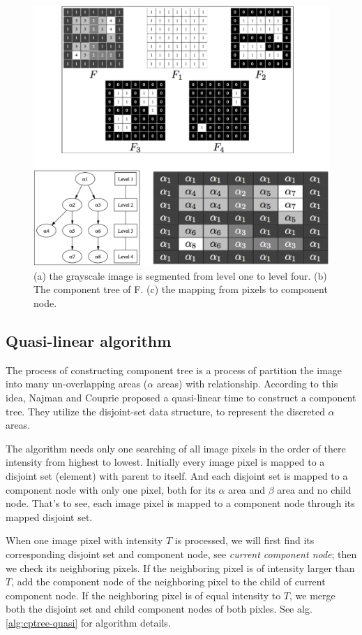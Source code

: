 \begin{figure}[htbp]
\centering
\includegraphics[width=1.0\textwidth]{images/cptree_alpha}
\caption{(a) the grayscale image is segmented from level one to level four. (b) The component tree of F. (c) the mapping from pixels to component node.}
\label{fig:cptree-alpha}
\end{figure}

\subsection{Quasi-linear algorithm}
The process of constructing component tree is a process of partition the image into many un-overlapping areas ($\alpha$ areas) with relationship. According to this idea, Najman and Couprie\cite{najman2006building} proposed a quasi-linear time to construct a component tree. They utilize the disjoint-set data structure,  to represent the discreted $\alpha$ areas.

The algorithm needs only one searching of all image pixels in the order of there intensity from highest to lowest. Initially every image pixel is mapped to a disjoint set (element) with parent to itself. And each disjoint set is mapped to a component node with only one pixel, both for its $\alpha$ area and $\beta$ area and no child node. That's to see, each image pixel is mapped to a component node through its mapped disjoint set.

When one image pixel with intensity $T$ is processed, we will first find its corresponding disjoint set and component node, see \emph{current component node}; then we check its neighboring pixels. If the neighboring pixel is of intensity larger than $T$, add the component node of the neighboring pixel to the child of current component node. If the neighboring pixel is of equal intensity to $T$, we merge both the disjoint set and child component nodes of both pixles. See alg.\ref{alg:cptree-quasi} for algorithm details.


